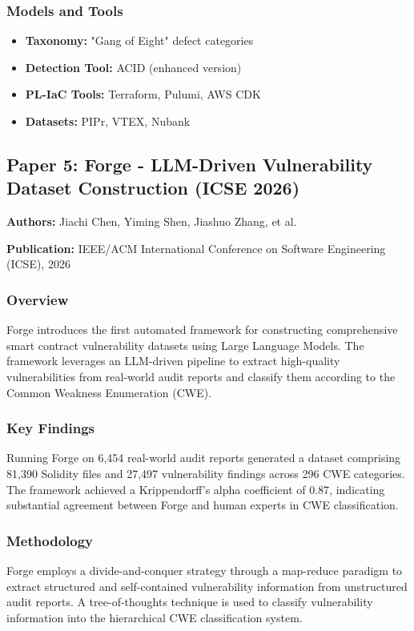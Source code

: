 \documentclass[11pt,a4paper]{article}
\begin{document}
\subsubsection{Models and Tools}
\begin{itemize}
    \item \textbf{Taxonomy:} "Gang of Eight" defect categories
    \item \textbf{Detection Tool:} ACID (enhanced version)
    \item \textbf{PL-IaC Tools:} Terraform, Pulumi, AWS CDK
    \item \textbf{Datasets:} PIPr, VTEX, Nubank
\end{itemize}

\subsection{Paper 5: Forge - LLM-Driven Vulnerability Dataset Construction (ICSE 2026)}

\textbf{Authors:} Jiachi Chen, Yiming Shen, Jiashuo Zhang, et al.

\textbf{Publication:} IEEE/ACM International Conference on Software Engineering (ICSE), 2026

\subsubsection{Overview}
Forge introduces the first automated framework for constructing comprehensive smart contract vulnerability datasets using Large Language Models. The framework leverages an LLM-driven pipeline to extract high-quality vulnerabilities from real-world audit reports and classify them according to the Common Weakness Enumeration (CWE).

\subsubsection{Key Findings}
Running Forge on 6,454 real-world audit reports generated a dataset comprising 81,390 Solidity files and 27,497 vulnerability findings across 296 CWE categories. The framework achieved a Krippendorff's alpha coefficient of 0.87, indicating substantial agreement between Forge and human experts in CWE classification.

\subsubsection{Methodology}
Forge employs a divide-and-conquer strategy through a map-reduce paradigm to extract structured and self-contained vulnerability information from unstructured audit reports. A tree-of-thoughts technique is used to classify vulnerability information into the hierarchical CWE classification system.
\end{document}
